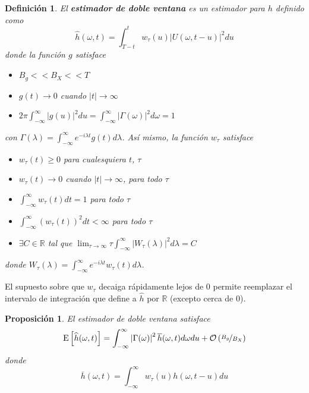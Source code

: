 \documentclass[12pt,letterpaper]{book}
\newtheorem{definicion}{Definición}[chapter]
\newtheorem{proposicion}[teorema]{Proposición}
\newcommand{\R}{\mathbb{R}}
\newcommand{\intR}{\int_{-\infty}^{\infty}}
\newcommand{\E}[1]{\mathrm{E}\left[ #1 \right]}
\newcommand{\abso}[1]{\left| #1 \right|}
\newcommand{\orden}[1]{\mathcal{O}\left( #1 \right)}
\begin{document}
\begin{definicion}
El \textbf{estimador de doble ventana} es un estimador para $h$ definido como
\begin{equation}
\widehat{h}(\omega, t) = \int_{T-t}^{t} w_\tau (u) \abso{U(\omega,t-u)}^{2} du
\end{equation}
donde la función $g$ satisface
\begin{itemize}
\item $B_g << B_X << T$
\item $g(t) \rightarrow 0$ cuando $\abso{t} \rightarrow \infty$
\item $2\pi \intR \abso{g(u)}^{2} du = \intR \abso{\Gamma(\omega)}^{2} d\omega = 1$
\end{itemize}
con $\Gamma(\lambda) = \intR e^{-i \lambda t} g(t) d\lambda$. Así mismo, la función $w_\tau$ satisface
\begin{itemize}
\item $w_\tau(t) \geq 0$ para cualesquiera $t$, $\tau$
\item $w_\tau(t) \rightarrow 0$ cuando $\abso{t} \rightarrow \infty$, para todo $\tau$
\item $\displaystyle \intR w_\tau(t) dt = 1$ para todo $\tau$
\item $\displaystyle \intR \left( w_\tau(t) \right)^{2} dt < \infty$ para todo $\tau$
\item $\exists C \in \R$ tal que  
$\displaystyle \lim_{\tau\rightarrow\infty} \tau \intR \abso{ W_{\tau}(\lambda) }^{2} d\lambda = C$
\end{itemize}
donde $W_\tau(\lambda) = \intR e^{-i \lambda t} w_\tau(t) d\lambda$.
\label{estimador_doble_ventana}
\end{definicion}

El supuesto sobre que $w_\tau$ decaiga rápidamente lejos de 0 permite reemplazar el intervalo de integración que define a $\widehat{h}$ por $\R$ (excepto cerca de 0). 

\begin{proposicion}
El estimador de doble ventana satisface
\begin{equation}
\E{\widehat{h}(\omega, t)} = \intR \abso{\Gamma(\omega)}^{2} \overline{h}(\omega,t) d\omega du +
\orden{\nicefrac{B_g}{B_X}}
\end{equation}
donde
\begin{equation}
\overline{h}(\omega,t) = \intR w_\tau (u) h(\omega, t-u) du
\end{equation}
\label{lazy:med_dd}
\end{proposicion}
\end{document}
